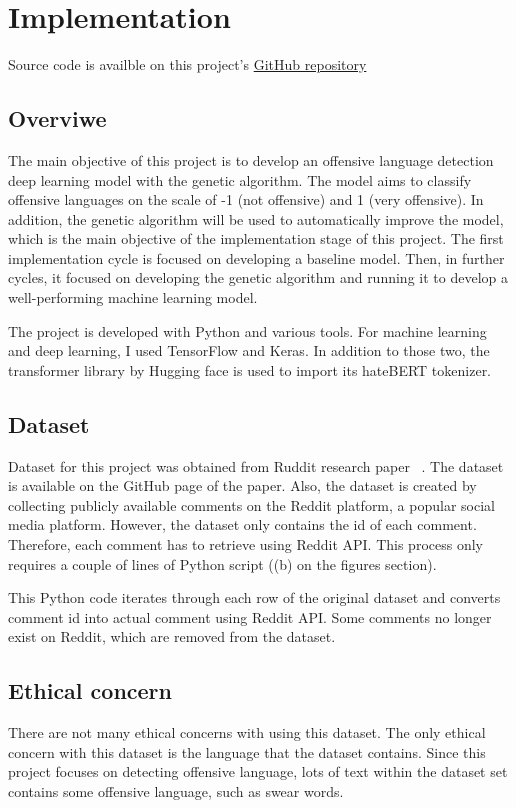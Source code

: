\documentclass[11pt, natbib=false]{article}
\begin{document}
\section{Implementation}
Source code is availble on this project's \href{https://github.com/hayacon/cs_final_project}{GitHub repository}
\subsection{Overviwe}
The main objective of this project is to develop an offensive language detection deep learning model with the genetic algorithm.
The model aims to classify offensive languages on the scale of -1 (not offensive) and 1 (very offensive).
In addition, the genetic algorithm will be used to automatically improve the model, which is the main objective of the implementation stage of this project.
The first implementation cycle is focused on developing a baseline model.
Then, in further cycles, it focused on developing the genetic algorithm and running it to develop a well-performing machine learning model.

The project is developed with Python and various tools.
For machine learning and deep learning, I used TensorFlow and Keras.
In addition to those two, the transformer library by Hugging face is used to import its hateBERT tokenizer.

\subsection{Dataset}
Dataset for this project was obtained from Ruddit research paper ~\cite{hada2021ruddit}.
The dataset is available on the GitHub page of the paper.
Also, the dataset is created by collecting publicly available comments on the Reddit platform, a popular social media platform.
However, the dataset only contains the id of each comment.
Therefore, each comment has to retrieve using Reddit API.
This process only requires a couple of lines of Python script ((b) on the figures section).

This Python code iterates through each row of the original dataset and converts comment id into actual comment using Reddit API.
Some comments no longer exist on Reddit, which are removed from the dataset.

\subsection{Ethical concern}
There are not many ethical concerns with using this dataset.
The only ethical concern with this dataset is the language that the dataset contains.
Since this project focuses on detecting offensive language, lots of text within the dataset set contains some offensive language, such as swear words. 
\end{document}
